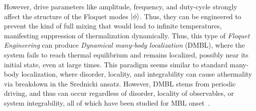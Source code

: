 \documentclass[%
reprint,
superscriptaddress,
amsmath,amssymb,
aps,
prb,
showkeys,
]{revtex4-2}
\begin{document}
However, drive parameters like amplitude, frequency, and duty-cycle strongly affect the structure of the Floquet modes $\ket{\phi}$. Thus, they can be engineered to prevent the kind of full mixing that would lead to infinite temperatures, manifesting suppression of thermalization dynamically. Thus, this type of \textit{Floquet Engineering} can produce \textit{Dynamical many-body localization} (DMBL), where the system fails to reach thermal equilibrium and remains localized, possibly  near its initial state, even at large times. This paradigm seems similar to standard many-body localization\cite{Sougata2023, sierant_2023}, where disorder, locality, and integrability can cause athermality via breakdown in the Srednicki ansatz. However, DMBL {stems from periodic driving}, and thus can occur regardless of disorder, locality of observables, or system integrability, all of which have been studied for MBL onset~\cite{Sougata2023,Fabien2018,garratt_resonant_2022}.
\end{document}
